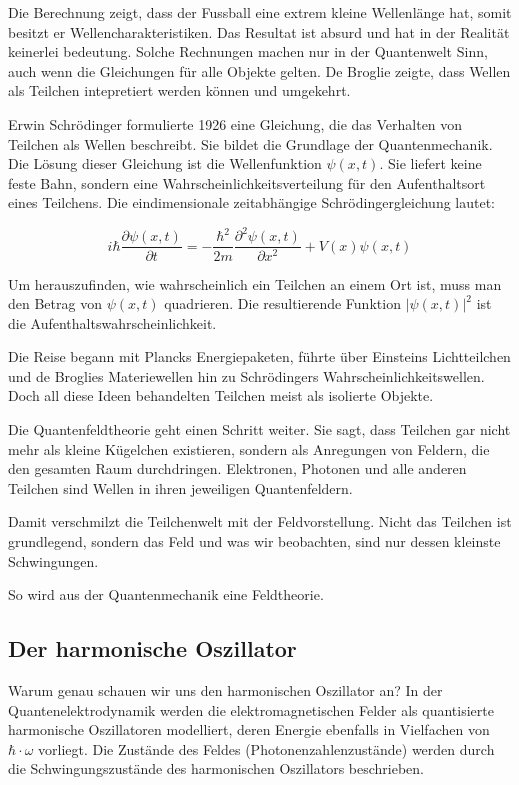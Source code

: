 	Die Berechnung zeigt, dass der Fussball eine extrem kleine Wellenlänge hat, somit besitzt er Wellencharakteristiken.
	Das Resultat ist absurd und hat in der Realität keinerlei bedeutung.
	Solche Rechnungen machen nur in der Quantenwelt Sinn, auch wenn die Gleichungen für alle Objekte gelten. 
	De Broglie zeigte, dass Wellen als Teilchen intepretiert werden können und umgekehrt. 
	
	
	
	Erwin Schrödinger formulierte 1926 eine Gleichung, die das Verhalten von Teilchen als Wellen beschreibt. 
	Sie bildet die Grundlage der Quantenmechanik. Die Lösung dieser Gleichung ist die Wellenfunktion \( \psi(x, t) \). Sie liefert keine feste Bahn, sondern eine Wahrscheinlichkeitsverteilung für den Aufenthaltsort eines Teilchens.  
	Die eindimensionale zeitabhängige Schrödingergleichung lautet:
	
	\begin{equation}
		i \hbar \frac{\partial \psi(x,t)}{\partial t} = -\frac{\hbar^2}{2m} \frac{\partial^2 \psi(x,t)}{\partial x^2} + V(x) \psi(x,t)
	\end{equation}
	
	
	Um herauszufinden, wie wahrscheinlich ein Teilchen an einem Ort ist, muss man den Betrag von $\psi(x, t)$ quadrieren. 
	Die resultierende Funktion $|\psi(x, t)|^2$ ist die Aufenthaltswahrscheinlichkeit. 
	
	Die Reise begann mit Plancks Energiepaketen, führte über Einsteins Lichtteilchen und de Broglies Materiewellen hin zu Schrödingers Wahrscheinlichkeitswellen. 
	Doch all diese Ideen behandelten Teilchen meist als isolierte Objekte.
	
	Die Quantenfeldtheorie geht einen Schritt weiter.
	Sie sagt, dass Teilchen gar nicht mehr als kleine Kügelchen existieren, sondern als Anregungen von Feldern, die den gesamten Raum durchdringen. 
	Elektronen, Photonen und alle anderen Teilchen sind Wellen in ihren jeweiligen Quantenfeldern.
	
	Damit verschmilzt die Teilchenwelt mit der Feldvorstellung.
	Nicht das Teilchen ist grundlegend, sondern das Feld und was wir beobachten, sind nur dessen kleinste Schwingungen.
	
	So wird aus der Quantenmechanik eine Feldtheorie.
	
\subsection{Der harmonische Oszillator\label{fourier:subsection:derHarmonischeOszillator}}
Warum genau schauen wir uns den harmonischen Oszillator an?
In der Quantenelektrodynamik werden die elektromagnetischen Felder als quantisierte harmonische Oszillatoren modelliert, deren Energie ebenfalls in Vielfachen von $\hbar\cdot\omega$ vorliegt.
Die Zustände des Feldes (Photonenzahlenzustände) werden durch die Schwingungszustände des harmonischen Oszillators beschrieben.

